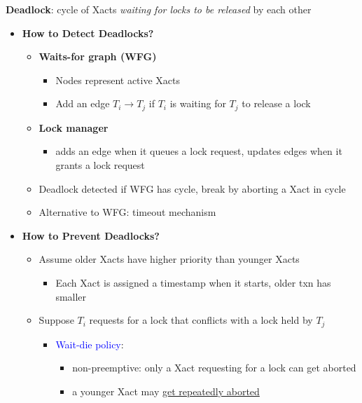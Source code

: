 \documentclass[10pt,landscape]{article}
\newcommand{\1}{\mathmybb{1}}
\begin{document}
\begin{multicols*}{3}
\textbf{Deadlock}: cycle of Xacts \textit{waiting for locks to be released} by each other
\begin{itemize}
    \item \textbf{How to Detect Deadlocks?}
    \begin{multicols}{2}
        \begin{itemize}
            \item \textbf{Waits-for graph (WFG)}
            \begin{itemize}
                \item Nodes represent active Xacts
                \item Add an edge $T_i \rightarrow T_j$ if $T_i$ is waiting for $T_j$ to release a lock
            \end{itemize}
            \item \textbf{Lock manager}
            \begin{itemize}
                \item adds an edge when it queues a lock request, updates edges when it grants a lock request
            \end{itemize}
            \item Deadlock detected if WFG has cycle, break by aborting a Xact in cycle
            \item Alternative to WFG: timeout mechanism
        \end{itemize}
    \end{multicols}
    \item \textbf{How to Prevent Deadlocks?}
    \begin{itemize}
        \item Assume older Xacts have higher priority than younger Xacts
        \begin{itemize}
            \item Each Xact is assigned a timestamp when it starts, older txn has smaller
        \end{itemize}
        \item Suppose $T_i$ requests for a lock that conflicts with a lock held by $T_j$
        \begin{itemize}
            \item \textcolor{blue}{Wait-die policy}:
            \begin{itemize}
                \item non-preemptive: only a Xact requesting for a lock can get aborted
                \item a younger Xact may \underline{get repeatedly aborted} 

\end{itemize}
\end{itemize}
\end{itemize}
\end{itemize}
\end{multicols*}
\end{document}
